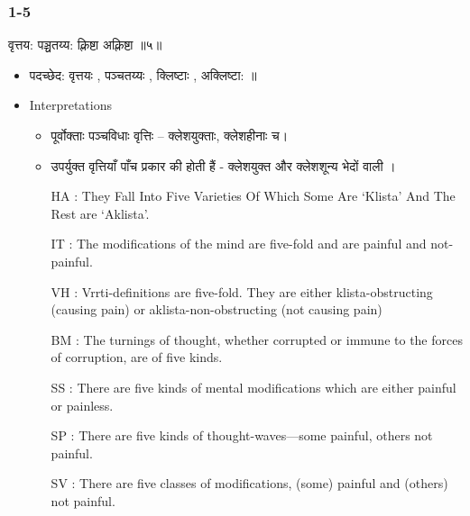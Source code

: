 \begin{frame}[fragile]\frametitle{1-5}

\begin{sanskrit}
वृत्तय: पञ्चतय्य: क्लिष्टा अक्लिष्टा ॥५॥
\end{sanskrit}


	\begin{itemize}
	\item पदच्छेद: वृत्तयः , पञ्चतय्यः , क्लिष्टाः , अक्लिष्टा: ॥
	\item Interpretations
		\begin{itemize}		
		\item पूर्वोक्ताः पञ्चविधाः वृत्तिः – क्लेशयुक्ताः, क्लेशहीनाः च।
		\item उपर्युक्त वृत्तियाँ पाँच प्रकार की होती हैं - क्लेशयुक्त और क्लेशशून्य भेदों वाली ।
		\item [HA]: They Fall Into Five Varieties Of Which Some Are ‘Klista’ And The Rest are ‘Aklista’.
		\item [IT]: The modifications of the mind are five-fold and are painful and not-painful.
		\item [VH]: Vrrti-definitions are five-fold. They are either klista-obstructing (causing pain) or aklista-non-obstructing (not causing pain)
		\item [BM]: The turnings of thought, whether corrupted or immune to the forces of corruption, are of five kinds.
		\item [SS]: There are five kinds of mental modifications which are either painful or painless.
		\item [SP]: There are five kinds of thought-waves—some painful, others not painful.
		\item [SV]: There are five classes of modifications, (some) painful and (others) not painful.
		\end{itemize}
	\end{itemize}

\end{frame}



